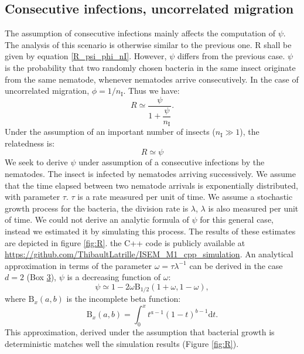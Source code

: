 \documentclass[10pt]{article}
\newcommand{\ud}{{\mathrm{d}}}
\newcommand{\nI}{{n_\textrm{I}}}
\newcommand{\psis}{\psi}
\newcommand{\psic}{\psi}
\begin{document}
\begin{multicols}{2}
\subsection*{Consecutive infections, uncorrelated migration}
The assumption of consecutive infections mainly affects the computation of $\psic$. The analysis of this scenario is otherwise similar to the previous one. R shall be given by equation \eqref{R_psi_phi_nI}.
 However, $\psic$ differs from the previous case. $\psic$ is the probability that two randomly chosen bacteria in the same insect originate from the same nematode, whenever nematodes arrive consecutively.
 In the case of uncorrelated migration, $\phi=1/ \nI$. Thus we have:
 \begin{equation}
 R \simeq \dfrac{\psic}{1+ \dfrac{\psic}{\nI}}.
 \end{equation}
Under the assumption of an important number of insects ($\nI \gg 1$), the relatedness is:
 \begin{equation}
 R \simeq \psic
 \end{equation}
 We seek to derive $\psic$ under assumption of a consecutive infections by the nematodes.
 The insect is infected by nematodes arriving successively.
We assume that the time elapsed between two nematode arrivals is exponentially distributed, with parameter $ \tau$.
$\tau$ is a rate measured per unit of time.
We assume a stochastic growth process for the bacteria, the division rate is $\lambda$, $\lambda$ is also measured per unit of time.
We could not derive an analytic formula of $\psic$ for this general case, instead we estimated it by simulating this process.
The results of these estimates are depicted in figure \ref{fig:R}. the C++ code is publicly available at \url{https://github.com/ThibaultLatrille/ISEM_M1_cpp_simulation}.
An analytical approximation in terms of the parameter $ \omega =\tau  \lambda^{-1}$ can be derived in the case $d=2$ (Box \hyperref[box:psi_consecutive]{3}), $\psis$ is a decreasing function of $ \omega $:
\begin{equation}
   \psic \simeq 1- 2 \omega \mathrm{B}_{1/2}(1+\omega,1-\omega) \label{eqn:star2},
\end{equation}
where $\mathrm{B}_x(a,b)$ is the incomplete beta function:
\begin{equation}
\mathrm{B}_x(a,b) = \int_0^x t^{a-1}(1-t)^{b-1} \ud t.
\end{equation}
This approximation, derived under the assumption that bacterial growth is deterministic matches well the simulation results (Figure \ref{fig:R}).


\end{multicols}
\end{document}
